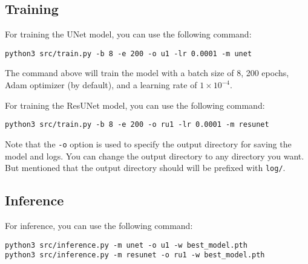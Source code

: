 \subsection{Training}

For training the UNet model, you can use the following command:

\begin{verbatim}
python3 src/train.py -b 8 -e 200 -o u1 -lr 0.0001 -m unet
\end{verbatim}

The command above will train the model with a batch size of 8, 200 epochs, Adam optimizer (by default), and a learning rate of $1 \times 10^{-4}$.

For training the ResUNet model, you can use the following command:

\begin{verbatim}
python3 src/train.py -b 8 -e 200 -o ru1 -lr 0.0001 -m resunet
\end{verbatim}

Note that the \texttt{-o} option is used to specify the output directory for saving the model and logs. You can change the output directory to any directory you want.
But mentioned that the output directory should will be prefixed with \texttt{log/}.

\subsection{Inference}

For inference, you can use the following command:

\begin{verbatim}
python3 src/inference.py -m unet -o u1 -w best_model.pth
python3 src/inference.py -m resunet -o ru1 -w best_model.pth
\end{verbatim}
